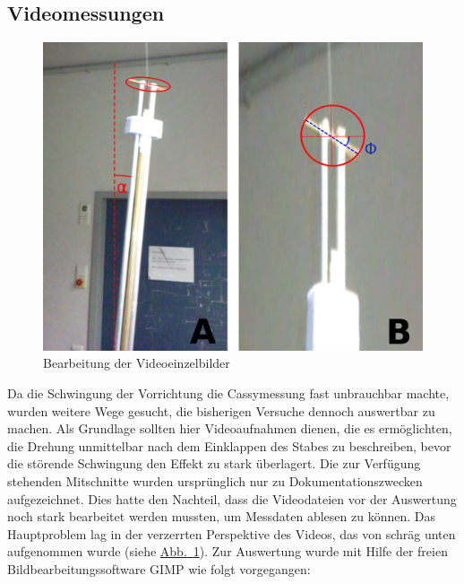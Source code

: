 \documentclass[halfparskip, 11pt]{scrartcl}
\newcommand{\hypref}[2]{\hyperref[#2]{{#1}~\ref{#2}}}
\begin{document}
\subsection{Videomessungen} %
\begin{figure}[ht]
\centering
\includegraphics[width=.95\textwidth]{auswert.jpg}
\caption{Bearbeitung der Videoeinzelbilder}
\label{Videobearbeitung}
\end{figure}
Da die Schwingung der Vorrichtung die Cassymessung fast unbrauchbar machte, wurden weitere Wege gesucht, die bisherigen Versuche dennoch auswertbar zu machen. Als Grundlage sollten hier Videoaufnahmen dienen, die es ermöglichten, die Drehung unmittelbar nach dem Einklappen des Stabes zu beschreiben, bevor die störende Schwingung den Effekt zu stark überlagert. Die zur Verfügung stehenden Mitschnitte wurden ursprünglich nur zu Dokumentationszwecken aufgezeichnet. Dies hatte den Nachteil, dass die Videodateien vor der Auswertung noch stark bearbeitet werden mussten, um Messdaten ablesen zu können. Das Hauptproblem lag in der verzerrten Perspektive des Videos, das von schräg unten aufgenommen wurde (siehe \hypref{Abb.}{Videobearbeitung}). Zur Auswertung wurde mit Hilfe der freien Bildbearbeitungssoftware GIMP wie folgt vorgegangen:
\end{document}
